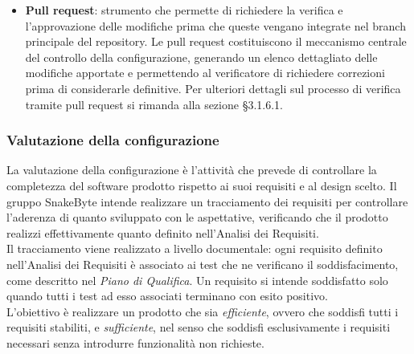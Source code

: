 \documentclass[10pt, letterpaper]{article}
\begin{document}
\begin{itemize}
    \item \textbf{Pull request}: strumento che permette di richiedere 
    la verifica e l'approvazione delle modifiche prima che queste vengano 
    integrate nel branch principale del repository. Le pull request 
    costituiscono il meccanismo centrale del controllo della configurazione, 
    generando un elenco dettagliato delle modifiche apportate e permettendo 
    al verificatore di richiedere correzioni prima di considerarle definitive. 
    Per ulteriori dettagli sul processo di verifica tramite pull request 
    si rimanda alla sezione §3.1.6.1.
\end{itemize}

\subsubsection{Valutazione della configurazione}
La valutazione della configurazione è l'attività che prevede di controllare 
la completezza del software prodotto rispetto ai suoi requisiti e al design 
scelto. Il gruppo SnakeByte intende realizzare un tracciamento dei requisiti 
per controllare l'aderenza di quanto sviluppato con le aspettative, 
verificando che il prodotto realizzi effettivamente quanto definito 
nell'Analisi dei Requisiti.
\noindent 
\\
Il tracciamento viene realizzato a livello documentale: ogni requisito 
definito nell'Analisi dei Requisiti è associato ai test che ne verificano 
il soddisfacimento, come descritto nel \textit{Piano di Qualifica}. 
Un requisito si intende soddisfatto solo quando tutti i test ad esso 
associati terminano con esito positivo.
\noindent
\\
L'obiettivo è realizzare un prodotto che sia \textit{efficiente}, 
ovvero che soddisfi tutti i requisiti stabiliti, e \textit{sufficiente}, 
nel senso che soddisfi esclusivamente i requisiti necessari senza 
introdurre funzionalità non richieste.
\end{document}
